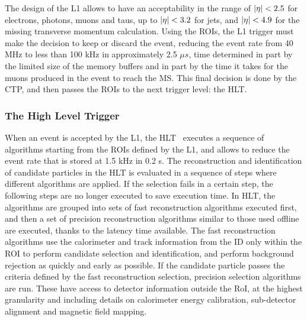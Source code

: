 The design of the \ac{L1} allows to have an acceptability in the range of \(|\eta|<2.5\) for electrons, photons, muons and taus, up to \(|\eta|<3.2\) for jets, and \(|\eta|<4.9\) for the missing transverse momentum calculation.
Using the \acp{ROI}, the \ac{L1} trigger must make the decision to keep or discard the event, reducing the event rate from 40 MHz to less than 100 kHz in approximately 2.5 \(\mu s\), time determined in part by the limited size of the memory buffers and in part by the time it takes for the muons produced in the event to reach the \ac{MS}. This final decision is done by the \ac{CTP}, and then passes the \acp{ROI} to the next trigger level: the \ac{HLT}.



\subsubsection{The High Level Trigger}


When an event is accepted by the \ac{L1}, the \ac{HLT}~\cite{ATLASHLTTrigger} executes a sequence of algorithms starting from the \acp{ROI} defined by the \ac{L1}, and allows to reduce the event rate that is stored at 1.5 kHz in 0.2 s. 
The reconstruction and identification of candidate particles in the \ac{HLT} is evaluated in a sequence of steps where different algorithms are applied. 
If the selection fails in a certain step, the following steps are no longer executed to save execution time. 
In \ac{HLT}, the algorithms are grouped into sets of fast reconstruction algorithms executed first, and then a set of precision reconstruction algorithms similar to those used offline are executed, thanks to the latency time available.
The fast reconstruction algorithms use the calorimeter and track information from the \ac{ID} only within the \ac{ROI} to perform candidate selection and identification, and perform background rejection as quickly and early as possible.
If the candidate particle passes the criteria defined by the fast reconstruction selection, precision selection algorithms are run. These have access to detector information outside the RoI, at the highest granularity and including details on calorimeter energy calibration, sub-detector alignment and magnetic field mapping.

